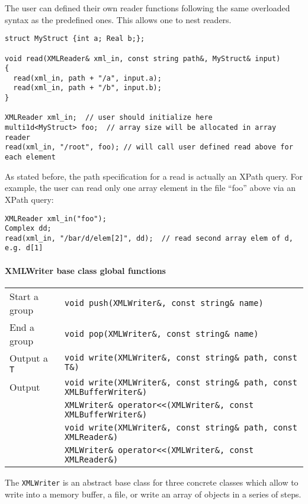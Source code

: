 \documentclass[12pt,letterpaper]{article}
\begin{document}
The user can defined their own reader functions following the same
overloaded syntax as the predefined ones. This allows one to nest
readers.
%
\begin{verbatim}
struct MyStruct {int a; Real b;};

void read(XMLReader& xml_in, const string path&, MyStruct& input)
{
  read(xml_in, path + "/a", input.a);
  read(xml_in, path + "/b", input.b);
}

XMLReader xml_in;  // user should initialize here
multi1d<MyStruct> foo;  // array size will be allocated in array reader
read(xml_in, "/root", foo); // will call user defined read above for each element
\end{verbatim}

As stated before, the path specification for a read is actually an
XPath query. For example, the user can read only one array element in the file
``foo'' above via an XPath query:
%
\begin{verbatim}
XMLReader xml_in("foo");
Complex dd;
read(xml_in, "/bar/d/elem[2]", dd);  // read second array elem of d, e.g. d[1]
\end{verbatim}



\paragraph{XMLWriter base class global functions}

\begin{flushleft}
  \begin{tabular}{|l|l|}
  \hline
  Start a group  & \verb|void push(XMLWriter&, const string& name)|\\
  End a group    & \verb|void pop(XMLWriter&, const string& name)|\\
  \hline
  Output a \verb|T| & \verb|void write(XMLWriter&, const string& path, const T&)| \\
  Output  & \verb|void write(XMLWriter&, const string& path, const XMLBufferWriter&)| \\
          & \verb|XMLWriter& operator<<(XMLWriter&, const XMLBufferWriter&)| \\
          & \verb|void write(XMLWriter&, const string& path, const XMLReader&)| \\
          & \verb|XMLWriter& operator<<(XMLWriter&, const XMLReader&)| \\
  \hline
 \end{tabular}
\end{flushleft}
%
The \verb|XMLWriter| is an abstract base class for three concrete
classes which allow to write into a memory buffer, a file, or write an
array of objects in a series of steps.
\end{document}
